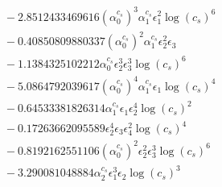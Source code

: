 \documentclass[10pt]{article}
\begin{document}
\begin{align*}
&{}  - 2.8512433469616 \left(\alpha_{0}^{c_s}\right)^{3} \alpha_{1}^{c_s} \epsilon_{1}^{2} \log{\left(c_{s} \right)}^{6} \\
&{}  - 0.40850809880337 \left(\alpha_{0}^{c_s}\right)^{2} \alpha_{1}^{c_s} \epsilon_{2}^{2} \epsilon_{3} \\
&{}  - 1.1384325102212 \alpha_{0}^{c_s} \epsilon_{2}^{3} \epsilon_{3}^{3} \log{\left(c_{s} \right)}^{6} \\
&{}  - 5.0864792039617 \left(\alpha_{0}^{c_s}\right)^{4} \alpha_{1}^{c_s} \epsilon_{1} \log{\left(c_{s} \right)}^{4} \\
&{}  - 0.64533381826314 \alpha_{1}^{c_s} \epsilon_{1} \epsilon_{2}^{4} \log{\left(c_{s} \right)}^{2} \\
&{}  - 0.17263662095589 \epsilon_{2}^{4} \epsilon_{3} \epsilon_{4}^{2} \log{\left(c_{s} \right)}^{4} \\
&{}  - 0.8192162551106 \left(\alpha_{0}^{c_s}\right)^{2} \epsilon_{2}^{2} \epsilon_{3}^{3} \log{\left(c_{s} \right)}^{6} \\
&{}  - 3.290081048884 \alpha_{2}^{c_s} \epsilon_{1}^{3} \epsilon_{2} \log{\left(c_{s} \right)}^{3}
\end{align*}
\end{document}

